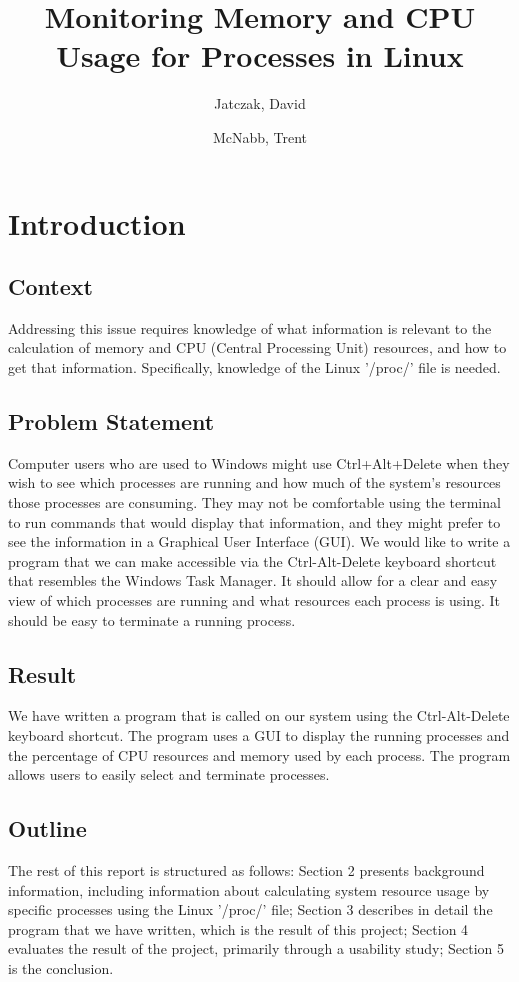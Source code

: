 \documentclass[12pt]{article}
\title{Monitoring Memory and CPU Usage for Processes in Linux}
\author{Jatczak, David \and McNabb, Trent}
\begin{document}
	
	\maketitle
	
	\section{Introduction}
	
	\subsection{Context}
	Addressing this issue requires knowledge of what information is relevant to the calculation of memory and CPU (Central Processing Unit) resources, and how to get that information. Specifically, knowledge of the Linux '/proc/' file is needed.
	
	\subsection{Problem Statement}
	Computer users who are used to Windows might use Ctrl+Alt+Delete when they wish to see which processes are running and how much of the system's resources those processes are consuming. They may not be comfortable using the terminal to run commands that would display that information, and they might prefer to see the information in a Graphical User Interface (GUI). We would like to write a program that we can make accessible via the Ctrl-Alt-Delete keyboard shortcut that resembles the Windows Task Manager. It should allow for a clear and easy view of which processes are running and what resources each process is using. It should be easy to terminate a running process.
	
	\subsection{Result}
	We have written a program that is called on our system using the Ctrl-Alt-Delete keyboard shortcut. The program uses a GUI to display the running processes and the percentage of CPU resources and memory used by each process. The program allows users to easily select and terminate processes.
	
	\subsection{Outline}
	The rest of this report is structured as follows: Section 2 presents background information, including information about calculating system resource usage by specific processes using the Linux '/proc/' file; Section 3 describes in detail the program that we have written, which is the result of this project; Section 4 evaluates the result of the project, primarily through a usability study; Section 5 is the conclusion.
	
\end{document}

